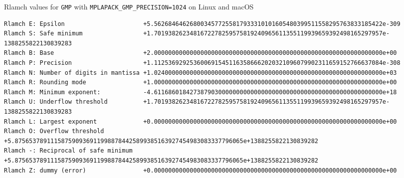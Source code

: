 \documentclass[12pt]{article}
\begin{document}
\begin{table}
\caption{Rlamch values for {\tt GMP} with {\tt MPLAPACK\_GMP\_PRECISION=1024} on Linux and macOS} \label{rlamchgmp1024}
\begin{center}
\scriptsize
{
\begin{verbatim}
Rlamch E: Epsilon                      +5.5626846462680034577255817933310101605480399511558295763833185422e-309
Rlamch S: Safe minimum                 +1.7019382623481672278259575819240965611355119939659392498165297957e-1388255822130839283
Rlamch B: Base                         +2.0000000000000000000000000000000000000000000000000000000000000000e+00
Rlamch P: Precision                    +1.1125369292536006915451163586662020321096079902311659152766637084e-308
Rlamch N: Number of digits in mantissa +1.0240000000000000000000000000000000000000000000000000000000000000e+03
Rlamch R: Rounding mode                +1.0000000000000000000000000000000000000000000000000000000000000000e+00
Rlamch M: Minimum exponent:            -4.6116860184273879030000000000000000000000000000000000000000000000e+18
Rlamch U: Underflow threshold          +1.7019382623481672278259575819240965611355119939659392498165297957e-1388255822130839283
Rlamch L: Largest exponent             +0.0000000000000000000000000000000000000000000000000000000000000000e+00
Rlamch O: Overflow threshold           +5.8756537891115875909369119988784425899385163927454983083337796065e+1388255822130839282
Rlamch -: Reciprocal of safe minimum   +5.8756537891115875909369119988784425899385163927454983083337796065e+1388255822130839282
Rlamch Z: dummy (error)                +0.0000000000000000000000000000000000000000000000000000000000000000e+00
\end{verbatim}
}
\end{center}
\end{table}
\end{document}
